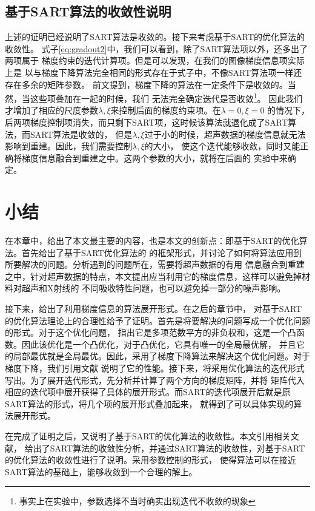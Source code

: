 \subsection{基于SART算法的收敛性说明}
上述的证明已经说明了SART算法是收敛的。接下来考虑基于SART的优化算法的收敛性。
式子\eqref{eq:gradout2}中，我们可以看到，除了SART算法项以外，还多出了两项属于
梯度约束的迭代计算项。但是可以发现，在我们的图像梯度信息项实际上是
以与梯度下降算法完全相同的形式存在于式子中，不像SART算法项一样还存在多余的矩阵参数。
前文提到，梯度下降的算法在一定条件下是收敛的。当然，当这些项叠加在一起的时候，我们
无法完全确定迭代是否收敛\footnote{事实上在实验中，参数选择不当时确实出现迭代不收敛的现象}。
因此我们才增加了相应的尺度参数$\lambda,\xi$来控制后面的梯度约束项。在$\lambda=0,\xi=0$
的情况下，后两项梯度控制项消失，而只剩下SART项，这时候该算法就退化成了SART算法，而SART算法是收敛的，
但是$\lambda,\xi$过于小的时候，超声数据的梯度信息就无法影响到重建。因此，我们需要控制$\lambda,\xi$的大小，
使这个迭代能够收敛，同时又能正确将梯度信息融合到重建之中。这两个参数的大小，就将在后面的
实验中来确定。


\section{小结}
在本章中，给出了本文最主要的内容，也是本文的创新点：即基于SART的优化算法。首先给出了基于SART优化算法的
的框架形式，并讨论了如何将算法应用到所要解决的问题。分析遇到的问题所在，需要将超声数据的有用
信息融合到重建之中，针对超声数据的特点，本文提出应当利用它的梯度信息，这样可以避免掉材料对超声和X射线的
不同吸收特性问题，也可以避免掉一部分的噪声影响。

接下来，给出了利用梯度信息的算法展开形式。在之后的章节中，
对基于SART的优化算法理论上的合理性给予了证明。首先是将要解决的问题写成一个优化问题的形式。对于这个优化问题，
指出它是多项范数平方的非负权和，这是一个凸函数。因此该优化是一个凸优化，对于凸优化，它具有唯一的全局最优解，
并且它的局部最优就是全局最优。因此，采用了梯度下降算法来解决这个优化问题。对于梯度下降，我们引用文献
说明了它的性能。接下来，将采用优化算法的迭代形式写出。为了展开迭代形式，先分析并计算了两个方向的梯度矩阵，并将
矩阵代入相应的迭代项中展开获得了具体的展开形式。而SART的迭代项展开后就是原SART算法的形式，将几个项的展开形式叠加起来，
就得到了可以具体实现的算法展开形式。

在完成了证明之后，又说明了基于SART的优化算法的收敛性。本文引用相关文献，
给出了SART算法的收敛性分析，并通过SART算法的收敛性，对基于SART的优化算法的收敛性进行了说明。采用参数控制的形式，
使得算法可以在接近SART算法的基础上，能够收敛到一个合理的解上。

